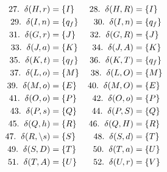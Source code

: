 \documentclass[a4paper,10pt]{article}
\begin{document}
\begin{align*}
		27. \hspace{2mm} \delta(H, r) &= \{I\} & 28. \hspace{2mm} \delta(H, R) &= \{I\} \\
		29. \hspace{2mm} \delta(I, n) &= \{q_f\} & 30. \hspace{2mm} \delta(I, n) &= \{q_f\} \\
		31. \hspace{2mm} \delta(G, r) &= \{J\} & 32. \hspace{2mm} \delta(G, R) &= \{J\} \\
		33. \hspace{2mm} \delta(J, a) &= \{K\} & 34. \hspace{2mm} \delta(J, A) &= \{K\} \\
		35. \hspace{2mm} \delta(K, t) &= \{q_f\} & 36. \hspace{2mm} \delta(K, T) &= \{q_f\} \\
		37. \hspace{2mm} \delta(L, o) &= \{M\} & 38. \hspace{2mm} \delta(L, O) &= \{M\} \\
		39. \hspace{2mm} \delta(M, o) &= \{E\} & 40. \hspace{2mm} \delta(M, O) &= \{E\} \\
		41. \hspace{2mm} \delta(O, o) &= \{P\} & 42. \hspace{2mm} \delta(O, o) &= \{P\} \\
		43. \hspace{2mm} \delta(P, s) &= \{Q\} & 44. \hspace{2mm} \delta(P, S) &= \{Q\} \\
		45. \hspace{2mm} \delta(Q, h) &= \{R\} & 46. \hspace{2mm} \delta(Q, H) &= \{R\} \\
		47. \hspace{2mm} \delta(R, \backslash s) &= \{S\} & 48. \hspace{2mm} \delta(S, d) &= \{T\} \\
		49. \hspace{2mm} \delta(S, D) &= \{T\} & 50. \hspace{2mm} \delta(T, a) &= \{U\} \\
		51. \hspace{2mm} \delta(T, A) &= \{U\} & 52. \hspace{2mm} \delta(U, r) &= \{V\} \\

\end{align*}
\end{document}
